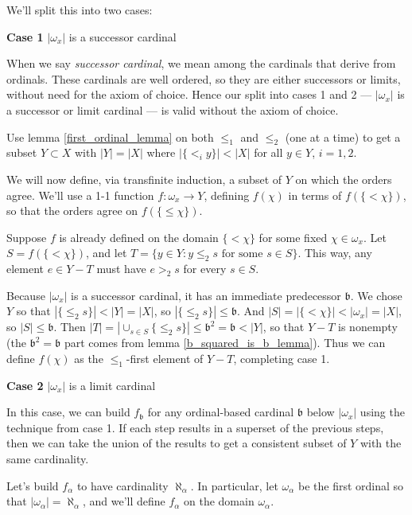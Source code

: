 \documentclass[11pt]{amsart}
\begin{document}
We'll split this into two cases:

{\bf Case 1 } $|\omega_x|$ is a successor cardinal

When we say {\em successor cardinal}, we mean among
the cardinals that derive from ordinals. These cardinals are
well ordered, so they are either successors or limits, without
need for the axiom of choice. Hence our split into cases 1 and 2 ---
$|\omega_x|$ is a successor or limit cardinal --- is valid without the axiom of choice.

Use lemma \ref{first_ordinal_lemma} on both $\le_1$ and $\le_2$ (one
at a time) to get a subset $Y \subset X$
with $|Y| = |X|$ where $|\{ <_i y \}| < |X|$ for all $y\in Y$, $i=1,2$.

We will now define, via transfinite induction, a subset of $Y$ on which the orders agree.
We'll use a 1-1 function $f : \omega_x \to Y$, defining $f(\chi)$ in terms
of $f( \{ < \chi \} )$, so that the orders agree on $f( \{ \le \chi \} )$.

Suppose $f$ is already defined on the domain $\{ < \chi \}$ for some fixed $\chi \in \omega_x$.
Let $S = f( \{ < \chi \} )$, and 
let $T = \{ y \in Y : y \le_2 s \text{ for some } s \in S \}$.
This way, any element $e \in Y - T$ must have $e >_2 s$ for every $s \in S$.

Because $|\omega_x|$ is a successor cardinal, it has an immediate predecessor
$\mathfrak b$.
We chose $Y$ so that $|\{\le_2 s\}| < |Y|=|X|$, so $|\{\le_2 s\}| \le \mathfrak b$.
And $|S| = |\{ < \chi \}| < |\omega_x| = |X|$, so $|S| \le \mathfrak b$.
Then $|T| = |\cup_{s\in S}\{\le_2 s\}| \le \mathfrak b^2 = \mathfrak b < |Y|$,
so that $Y-T$ is nonempty
(the $\mathfrak b^2 = \mathfrak b$ part comes from lemma \ref{b_squared_is_b_lemma}).
Thus we can define $f(\chi )$ as the
$\le_1$-first element of $Y-T$, completing case 1.

{\bf Case 2 } $|\omega_x|$ is a limit cardinal

In this case, we can build $f_\mathfrak b$ for any ordinal-based cardinal $\mathfrak b$ below
$|\omega_x|$ using the technique from case 1. If each step results in a
superset of the previous steps, then we can take the union of the results to
get a consistent subset of $Y$ with the same cardinality.

Let's build $f_\alpha$ to have cardinality $\aleph_\alpha$.
In particular, let $\omega_\alpha$ be the first ordinal so that
$|\omega_\alpha| = \aleph_\alpha$, and we'll define
$f_\alpha$ on the domain $\omega_\alpha$.
\end{document}
